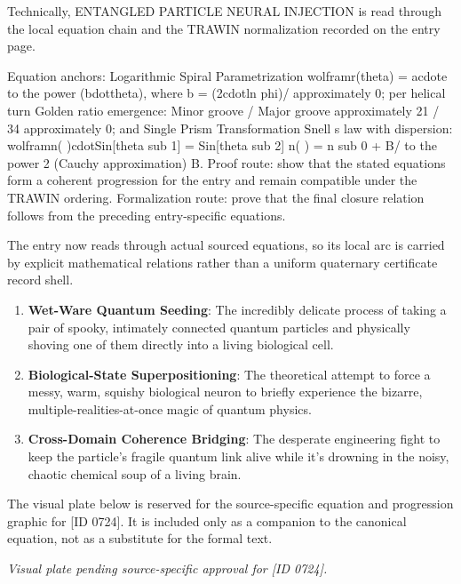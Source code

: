 Technically, ENTANGLED PARTICLE NEURAL INJECTION is read through the local equation chain and the TRAWIN normalization recorded on the entry page.

Equation anchors: Logarithmic Spiral Parametrization wolframr(theta) = acdote to the power (bdottheta), where b = (2cdotln phi)/  approximately 0; per helical turn Golden ratio emergence: Minor groove / Major groove approximately 21  / 34  approximately 0; and Single Prism Transformation Snell s law with dispersion: wolframn( )cdotSin[theta sub 1] = Sin[theta sub 2] n( ) = n sub 0 + B/  to the power 2 (Cauchy approximation) B. Proof route: show that the stated equations form a coherent progression for the entry and remain compatible under the TRAWIN ordering. Formalization route: prove that the final closure relation follows from the preceding entry-specific equations.

The entry now reads through actual sourced equations, so its local arc is carried by explicit mathematical relations rather than a uniform quaternary certificate record shell.
\endgroup

\begin{enumerate}[leftmargin=1.6em,itemsep=6pt,topsep=4pt]
\item \textbf{Wet-Ware Quantum Seeding}: The incredibly delicate process of taking a pair of spooky, intimately connected quantum particles and physically shoving one of them directly into a living biological cell.
\item \textbf{Biological-State Superpositioning}: The theoretical attempt to force a messy, warm, squishy biological neuron to briefly experience the bizarre, multiple-realities-at-once magic of quantum physics.
\item \textbf{Cross-Domain Coherence Bridging}: The desperate engineering fight to keep the particle's fragile quantum link alive while it's drowning in the noisy, chaotic chemical soup of a living brain.
\end{enumerate}

\begingroup\footnotesize\sloppy
The visual plate below is reserved for the source-specific equation and progression graphic for [ID 0724]. It is included only as a companion to the canonical equation, not as a substitute for the formal text.
\par\endgroup
\begingroup\footnotesize\itshape
Visual plate pending source-specific approval for [ID 0724].
\par\endgroup

